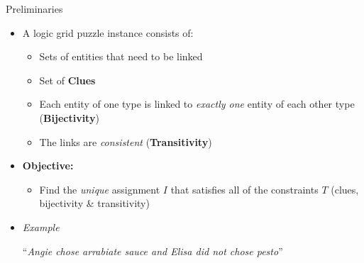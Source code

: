 \documentclass[handout]{beamer}
\begin{document}
\begin{frame}{Preliminaries}
    \begin{itemize}
        \item A logic grid puzzle instance consists of:
              \begin{itemize}
                  \item Sets of entities that need to be linked
                  \item Set of \textbf{Clues}
                  \item Each entity of one type is linked to \textit{exactly one} entity of each other type (\textbf{Bijectivity})
                  \item The links are \textit{consistent} (\textbf{Transitivity})
              \end{itemize}\pause
        \item  \textbf{Objective:}
              \begin{itemize}\small
                  \item Find the \textit{unique} assignment $I$ that satisfies all of the constraints $T$ (clues, bijectivity \& transitivity)
              \end{itemize}\pause
        \item \textit{Example}
              \begin{center}
                  \small``\textit{Angie chose arrabiate sauce and Elisa did not chose pesto}'' \\
              \end{center}
    \end{itemize}\pause

\end{frame}
\end{document}
